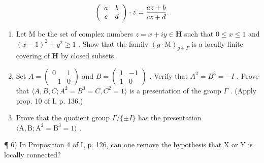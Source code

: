 \[
\left( \begin{array}{c c} a & b \\ c & d \end{array} \right) \cdot z = \frac {a z + b}{c z + d}.
\]

\begin{enumerate}
\def\labelenumi{\alph{enumi})}
\setcounter{enumi}{1}
\item
  Let M be the set of complex numbers \(z = x + iy \in \mathbf{H}\) such that \(0 \leqslant x \leqslant 1\) and \((x - 1)^2 + y^2 \geqslant 1\) . Show that the family \((g \cdot \mathrm{M})_{g \in \Gamma}\) is a locally finite covering of \(\mathbf{H}\) by closed subsets.
\item
  Set \(A = \begin{pmatrix} 0 & 1 \\ -1 & 0 \end{pmatrix}\) and \(B = \begin{pmatrix} 1 & -1 \\ 1 & 0 \end{pmatrix}\) . Verify that \(A^{2} = B^{3} = -I\) . Prove that \(\langle A, B, C; A^{2} = B^{3} = C, C^{2} = 1 \rangle\) is a presentation of the group \(\Gamma\) . (Apply prop. 10 of I, p. 136.)
\item
  Prove that the quotient group \(\Gamma/\{\pm I\}\) has the presentation \(\langle\mathrm{A},\mathrm{B};\mathrm{A}^{2}=\mathrm{B}^{3}=1\rangle\) .
\end{enumerate}

¶ 6) In Proposition 4 of I, p. 126, can one remove the hypothesis that X or Y is locally connected?

